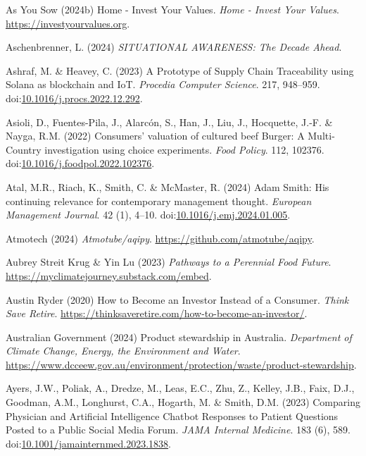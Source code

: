 \documentclass[
  letterpaper,
  DIV=11,
  numbers=noendperiod]{scrartcl}
\newlength{\cslhangindent}
\newenvironment{CSLReferences}[2] %
 {\begin{list}{}{%
  \setlength{\itemindent}{0pt}
  \setlength{\leftmargin}{0pt}
  \setlength{\parsep}{0pt}
  \ifodd #1
   \setlength{\leftmargin}{\cslhangindent}
   \setlength{\itemindent}{-1\cslhangindent}
  \fi
  \setlength{\itemsep}{#2\baselineskip}}}
 {\end{list}}
\begin{document}
\begin{CSLReferences}{0}{1}
As You Sow (2024b) Home - {Invest Your Values}. \emph{Home - Invest Your
Values}. \url{https://investyourvalues.org}.

Aschenbrenner, L. (2024) \emph{{SITUATIONAL AWARENESS}: {The Decade
Ahead}}.

Ashraf, M. \& Heavey, C. (2023) A {Prototype} of {Supply Chain
Traceability} using {Solana} as blockchain and {IoT}. \emph{Procedia
Computer Science}. 217, 948--959.
doi:\href{https://doi.org/10.1016/j.procs.2022.12.292}{10.1016/j.procs.2022.12.292}.

Asioli, D., Fuentes-Pila, J., Alarcón, S., Han, J., Liu, J., Hocquette,
J.-F. \& Nayga, R.M. (2022) Consumers' valuation of cultured beef
{Burger}: {A Multi-Country} investigation using choice experiments.
\emph{Food Policy}. 112, 102376.
doi:\href{https://doi.org/10.1016/j.foodpol.2022.102376}{10.1016/j.foodpol.2022.102376}.

Atal, M.R., Riach, K., Smith, C. \& McMaster, R. (2024) Adam {Smith}:
{His} continuing relevance for contemporary management thought.
\emph{European Management Journal}. 42 (1), 4--10.
doi:\href{https://doi.org/10.1016/j.emj.2024.01.005}{10.1016/j.emj.2024.01.005}.

Atmotech (2024) \emph{Atmotube/aqipy}.
\url{https://github.com/atmotube/aqipy}.

Aubrey Streit Krug \& Yin Lu (2023) \emph{Pathways to a {Perennial Food
Future}}. \url{https://myclimatejourney.substack.com/embed}.

Austin Ryder (2020) How to {Become} an {Investor Instead} of a
{Consumer}. \emph{Think Save Retire}.
\url{https://thinksaveretire.com/how-to-become-an-investor/}.

Australian Government (2024) Product stewardship in {Australia}.
\emph{Department of Climate Change, Energy, the Environment and Water}.
\url{https://www.dcceew.gov.au/environment/protection/waste/product-stewardship}.

Ayers, J.W., Poliak, A., Dredze, M., Leas, E.C., Zhu, Z., Kelley, J.B.,
Faix, D.J., Goodman, A.M., Longhurst, C.A., Hogarth, M. \& Smith, D.M.
(2023) Comparing {Physician} and {Artificial Intelligence Chatbot
Responses} to {Patient Questions Posted} to a {Public Social Media
Forum}. \emph{JAMA Internal Medicine}. 183 (6), 589.
doi:\href{https://doi.org/10.1001/jamainternmed.2023.1838}{10.1001/jamainternmed.2023.1838}.


\end{CSLReferences}
\end{document}
